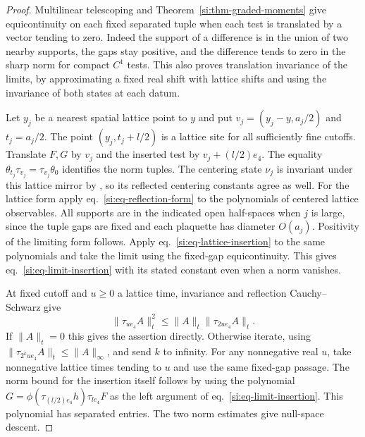 \documentclass[11pt,letterpaper,reqno]{amsart}
\numberwithin{equation}{section}
\renewcommand{\eqref}[1]{\textup{eq.~\ref{#1}}}
\theoremstyle{definition}
\theoremstyle{remark}
\begin{document}
\begin{proof}
Multilinear telescoping and Theorem~\ref{si:thm-graded-moments}
give equicontinuity on each fixed separated tuple when each
test is translated by a vector tending to zero. Indeed the
support of a difference is in the union of two nearby supports,
the gaps stay positive, and the difference tends to zero in
the sharp norm for compact $C^1$ tests. This also proves
translation invariance of the limits, by approximating a fixed
real shift with lattice shifts and using the invariance of
both states at each datum.

Let $y_j$ be a nearest spatial lattice point to $y$ and put
$v_j=(y_j-y,a_j/2)$ and $t_j=a_j/2$. The point
$(y_j,t_j+l/2)$ is a lattice site for all sufficiently fine
cutoffs. Translate $F,G$ by $v_j$ and the inserted test by
$v_j+(l/2)e_4$. The equality
$\theta_{t_j}\tau_{v_j}=\tau_{v_j}\theta_0$ identifies the
norm tuples. The centering state $\nu_j$ is invariant under
this lattice mirror by \cite[Theorem~B]{LP}, so its reflected
centering constants agree as well. For the lattice form apply
\eqref{si:eq-reflection-form} to the polynomials of centered
lattice observables. All supports are in the indicated open
half-spaces when $j$ is large, since the tuple gaps are fixed
and each plaquette has diameter $O(a_j)$. Positivity of the
limiting form follows. Apply \eqref{si:eq-lattice-insertion}
to the same polynomials and take the limit using the fixed-gap
equicontinuity. This gives \eqref{si:eq-limit-insertion} with
its stated constant even when a norm vanishes.

At fixed cutoff and $u\ge0$ a lattice time, invariance and
reflection Cauchy--Schwarz give
\[
 \|\tau_{ue_4}A\|_t^2\le\|A\|_t\|\tau_{2ue_4}A\|_t.
\]
If $\|A\|_t=0$ this gives the assertion directly. Otherwise
iterate, using $\|\tau_{2^kue_4}A\|_t\le\|A\|_\infty$, and
send $k$ to infinity. For any nonnegative real $u$, take
nonnegative lattice times tending to $u$ and use the same
fixed-gap passage. The norm bound for the insertion itself
follows by using the polynomial
$G=\phi(\tau_{(l/2)e_4}h)\tau_{le_4}F$
as the left argument of \eqref{si:eq-limit-insertion}.
This polynomial has separated
entries. The two norm estimates give null-space descent.
\end{proof}
\end{document}
